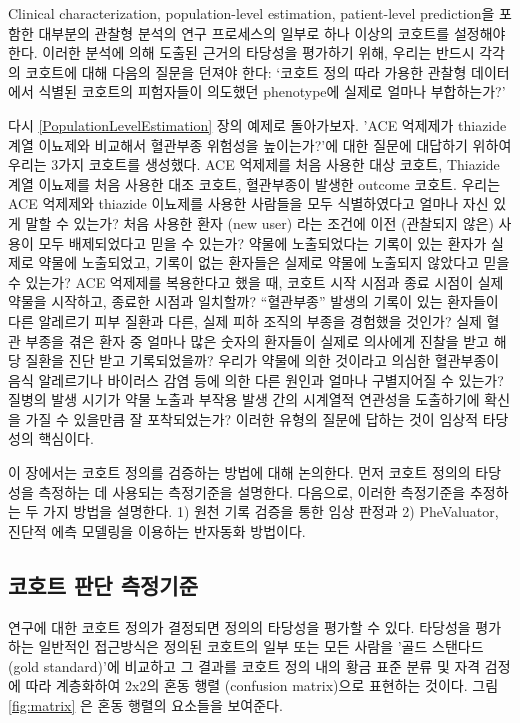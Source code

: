 \documentclass[11pt]{book}
\theoremstyle{definition}
\theoremstyle{definition}
\theoremstyle{definition}
\theoremstyle{remark}
\begin{document}
Clinical characterization, population-level estimation, patient-level
prediction을 포함한 대부분의 관찰형 분석의 연구 프로세스의 일부로 하나
이상의 코호트를 설정해야 한다. 이러한 분석에 의해 도출된 근거의 타당성을
평가하기 위해, 우리는 반드시 각각의 코호트에 대해 다음의 질문을 던져야
한다: `코호트 정의 따라 가용한 관찰형 데이터에서 식별된 코호트의
피험자들이 의도했던 phenotype에 실제로 얼마나 부합하는가?'

다시 \ref{PopulationLevelEstimation} 장의 예제로 돌아가보자. 'ACE
억제제가 thiazide 계열 이뇨제와 비교해서 혈관부종 위험성을 높이는가?'에
대한 질문에 대답하기 위하여 우리는 3가지 코호트를 생성했다. ACE 억제제를
처음 사용한 대상 코호트, Thiazide 계열 이뇨제를 처음 사용한 대조 코호트,
혈관부종이 발생한 outcome 코호트. 우리는 ACE 억제제와 thiazide 이뇨제를
사용한 사람들을 모두 식별하였다고 얼마나 자신 있게 말할 수 있는가? 처음
사용한 환자 (new user) 라는 조건에 이전 (관찰되지 않은) 사용이 모두
배제되었다고 믿을 수 있는가? 약물에 노출되었다는 기록이 있는 환자가
실제로 약물에 노출되었고, 기록이 없는 환자들은 실제로 약물에 노출되지
않았다고 믿을 수 있는가? ACE 억제제를 복용한다고 했을 때, 코호트 시작
시점과 종료 시점이 실제 약물을 시작하고, 종료한 시점과 일치할까?
``혈관부종'' 발생의 기록이 있는 환자들이 다른 알레르기 피부 질환과 다른,
실제 피하 조직의 부종을 경험했을 것인가? 실제 혈관 부종을 겪은 환자 중
얼마나 많은 숫자의 환자들이 실제로 의사에게 진찰을 받고 해당 질환을 진단
받고 기록되었을까? 우리가 약물에 의한 것이라고 의심한 혈관부종이 음식
알레르기나 바이러스 감염 등에 의한 다른 원인과 얼마나 구별지어질 수
있는가? 질병의 발생 시기가 약물 노출과 부작용 발생 간의 시계열적
연관성을 도출하기에 확신을 가질 수 있을만큼 잘 포착되었는가? 이러한
유형의 질문에 답하는 것이 임상적 타당성의 핵심이다.

이 장에서는 코호트 정의를 검증하는 방법에 대해 논의한다. 먼저 코호트
정의의 타당성을 측정하는 데 사용되는 측정기준을 설명한다. 다음으로,
이러한 측정기준을 추정하는 두 가지 방법을 설명한다. 1) 원천 기록 검증을
통한 임상 판정과 2) PheValuator, 진단적 에측 모델링을 이용하는 반자동화
방법이다.

\subsection{코호트 판단 측정기준}\label{--}

연구에 대한 코호트 정의가 결정되면 정의의 타당성을 평가할 수 있다.
타당성을 평가하는 일반적인 접근방식은 정의된 코호트의 일부 또는 모든
사람을 '골드 스탠다드 (gold standard)'에 비교하고 그 결과를 코호트 정의
내의 황금 표준 분류 및 자격 검정에 따라 계층화하여 2x2의 혼동 행렬
(confusion matrix)으로 표현하는 것이다. 그림 \ref{fig:matrix} 은 혼동
행렬의 요소들을 보여준다.
\end{document}
